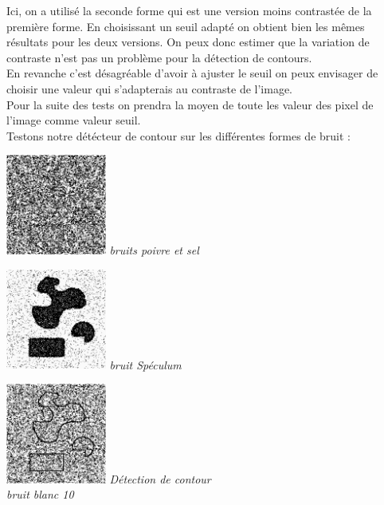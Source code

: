 \documentclass[a4,12pt]{article}
\begin{document}
Ici, on a utilisé la seconde forme qui est une version moins contrastée de la première forme. En choisissant un seuil adapté on obtient bien les mêmes résultats pour les deux versions.
On peux donc estimer que la variation de contraste n'est pas un problème pour la détection de contours.\\
En revanche c'est désagréable d'avoir à ajuster le seuil on peux envisager de choisir une valeur qui s'adapterais au contraste de l'image.\\
Pour la suite des tests on prendra la moyen de toute les valeur des pixel de l'image comme valeur seuil.\\
Testons notre détécteur de contour sur les différentes formes de bruit :\\

\noindent
\begin{center}
\begin{minipage}[c]{0.20\linewidth}
	\begin{center}
		\includegraphics[width = 33mm]{./img/p2test_grad_mean_formes2pets5.jpg}
		\textit{bruits poivre et sel}
	\end{center}
\end{minipage}
\begin{minipage}[c]{0.20\linewidth}
	\begin{center}
		\includegraphics[width = 33mm]{./img/p2test_grad_mean_formes1sp.jpg}
		\textit{bruit Spéculum}
	\end{center}
\end{minipage}
\begin{minipage}[c]{0.20\linewidth}
	\begin{center}
		\includegraphics[width = 33mm]{./img/p2test_grad_mean_formes2bb10.jpg}
		\textit{Détection de contour \\bruit blanc 10}
	\end{center}
\end{minipage}
\end{center}
\end{document}
